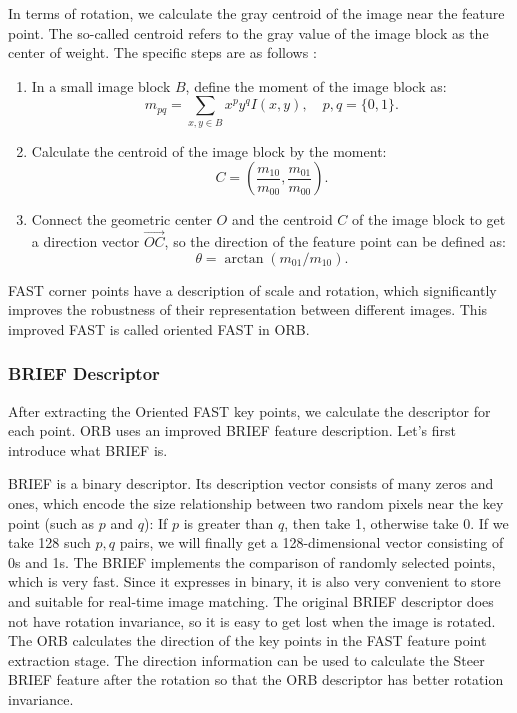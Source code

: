 In terms of rotation, we calculate the gray centroid of the image near the feature point. The so-called centroid refers to the gray value of the image block as the center of weight. The specific steps are as follows {\cite{Rosin1999}}:

\begin{enumerate}
\item In a small image block $B$, define the moment of the image block as:
\[
m_{pq}=\sum_{x,y \in B}x^{p}y^{q}I(x,y), \quad p, q = \{0,1\}.
\]
\item Calculate the centroid of the image block by the moment:
\[
C=\left(\frac{m_{10}}{m_{00}},\frac{m_{01}}{m_{00}}\right).
\]
\item Connect the geometric center $O$ and the centroid $C$ of the image block to get a direction vector $\overrightarrow{OC}$, so the direction of the feature point can be defined as:
\[
\theta = \arctan(m_{01}/m_{10}).
\]
\end{enumerate}
FAST corner points have a description of scale and rotation, which significantly improves the robustness of their representation between different images. This improved FAST is called oriented FAST in ORB.

\subsubsection{BRIEF Descriptor}
After extracting the Oriented FAST key points, we calculate the descriptor for each point. ORB uses an improved BRIEF feature description. Let's first introduce what BRIEF is.

BRIEF is a binary descriptor. Its description vector consists of many zeros and ones, which encode the size relationship between two random pixels near the key point (such as $p$ and $q$): If $p$ is greater than $q$, then take 1, otherwise take 0. If we take 128 such $p,q$ pairs, we will finally get a 128-dimensional vector  {\cite{calonder2010brief}} consisting of 0s and 1s. The BRIEF implements the comparison of randomly selected points, which is very fast. Since it expresses in binary, it is also very convenient to store and suitable for real-time image matching. The original BRIEF descriptor does not have rotation invariance, so it is easy to get lost when the image is rotated. The ORB calculates the direction of the key points in the FAST feature point extraction stage. The direction information can be used to calculate the Steer BRIEF feature after the rotation so that the ORB descriptor has better rotation invariance.

